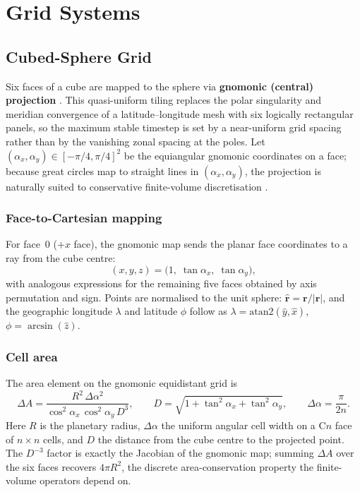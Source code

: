 \documentclass[11pt,a4paper]{article}
\begin{document}
\section{Grid Systems}

\subsection{Cubed-Sphere Grid}

Six faces of a cube are mapped to the sphere via \textbf{gnomonic (central) projection} \citep{Ronchi1996,PutmanLin2007}.  This quasi-uniform tiling replaces the polar singularity and meridian convergence of a latitude--longitude mesh with six logically rectangular panels, so the maximum stable timestep is set by a near-uniform grid spacing rather than by the vanishing zonal spacing at the poles.  Let $(\alpha_x,\alpha_y)\in[-\pi/4,\pi/4]^2$ be the equiangular gnomonic coordinates on a face; because great circles map to straight lines in $(\alpha_x,\alpha_y)$, the projection is naturally suited to conservative finite-volume discretisation \citep{Sadourny1972}.

\subsubsection{Face-to-Cartesian mapping}
For face~0 ($+x$ face), the gnomonic map sends the planar face coordinates to a ray from the cube centre:
\begin{equation}
  (x,y,z) = \bigl(1,\;\tan\alpha_x,\;\tan\alpha_y\bigr),
\end{equation}
with analogous expressions for the remaining five faces obtained by axis permutation and sign.  Points are normalised to the unit sphere: $\hat{\bm r}=\bm r/|\bm r|$, and the geographic longitude $\lambda$ and latitude $\phi$ follow as $\lambda=\mathrm{atan2}(\hat y,\hat x)$, $\phi=\arcsin(\hat z)$.

\subsubsection{Cell area}
The area element on the gnomonic equidistant grid is
\begin{equation}
  \Delta A = \frac{R^2\,\Delta\alpha^2}{\cos^2\!\alpha_x\,\cos^2\!\alpha_y\,D^3},
  \qquad D = \sqrt{1+\tan^2\!\alpha_x+\tan^2\!\alpha_y},
  \qquad \Delta\alpha=\frac{\pi}{2n}.
\end{equation}
Here $R$ is the planetary radius, $\Delta\alpha$ the uniform angular cell width on a C$n$ face of $n\times n$ cells, and $D$ the distance from the cube centre to the projected point.  The $D^{-3}$ factor is exactly the Jacobian of the gnomonic map; summing $\Delta A$ over the six faces recovers $4\pi R^2$, the discrete area-conservation property the finite-volume operators depend on.
\end{document}
